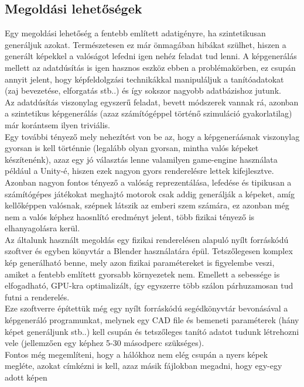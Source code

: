 \documentclass{article}
\begin{document}
\subsection{Megoldási lehetőségek}
Egy megoldási lehetőség a fentebb említett adatigényre, ha szintetikusan 
generáljuk azokat. Természetesen ez már önmagában hibákat szülhet, hiszen 
a generált képekkel a valóságot lefedni igen nehéz feladat tud lenni.
A képgenerálás mellett az adatdúsítás is igen hasznos eszköz ebben a problémakörben,
ez csupán annyit jelent, hogy képfeldolgzási technikákkal manipuláljuk a tanítóadatokat 
(zaj bevezetése, elforgatás stb..) és így sokszor nagyobb adatbázishoz jutunk.\\[5pt]
Az adatdúsítás viszonylag egyszerű feladat, bevett módszerek vannak rá, azonban 
a szintetikus képgenerálás (azaz számítógéppel történő szimuláció gyakorlatilag) már 
korántsem ilyen triviális.\\[5pt]
Egy további tényező mely nehezítést von be az, hogy a képgeneráásnak viszonylag gyorsan is kell 
történnie (legalább olyan gyorsan, mintha valós képeket készítenénk), 
azaz egy jó választás lenne valamilyen game-engine használata például a Unity-é, 
hiszen ezek nagyon gyors renderelésre lettek kifejlesztve. Azonban 
nagyon fontos tényező a valóság reprezentálása, lefedése és tipikusan a
számítógépes játékokat meghajtó motorok csak addig generálják a képeket, amíg 
kellőképpen valósnak, szépnek látszik az emberi szem számára, ez azonban 
még nem a valós képhez haosnlító eredményt jelent, több fizikai tényező is 
elhanyagolásra kerül.\\[5pt]
Az általunk használt megoldás egy fizikai renderelésen alapuló nyílt forráskódú 
szoftver és egyben könyvtár a Blender használatára épül. Tetszőlegesen 
komplex kép generálható benne, mely azon fizikai paramétereket is figyelembe veszi, 
amiket a fentebb említett gyorsabb környezetek nem. Emellett a sebessége is elfogadható, 
GPU-kra optimalizált, így egyszerre több szálon párhuzamosan tud futni a 
renderelés.\\[5pt]
Eze szoftverre építettük még egy nyílt forráskódú segédkönyvtár bevonásával 
a képgeneráló programunkat, melynek egy CAD file és bemeneti paraméterek (hány képet generáljunk stb..) 
kell csupán és tetszőleges tanító adatot tudunk létrehozni vele (jellemzően egy képhez 5-30 másodperc szükséges).\\[5pt]
Fontos még megemlíteni, hogy a hálókhoz nem elég csupán a nyers képek megléte, 
azokat címkézni is kell, azaz másik fájlokban megadni, hogy egy-egy adott képen 
\end{document}
